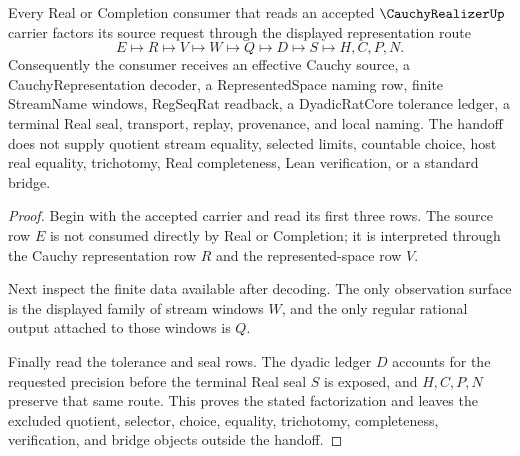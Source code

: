 \begin{theorem}
\label{thm:cauchy-realizer-representation-handoff}
Every Real or Completion consumer that reads an accepted $\CauchyRealizerUp$ carrier factors its source request through the displayed representation route
$$
E \longmapsto R \longmapsto V \longmapsto W \longmapsto Q \longmapsto D \longmapsto S \longmapsto H,C,P,N .
$$
Consequently the consumer receives an effective Cauchy source, a CauchyRepresentation decoder, a RepresentedSpace naming row, finite StreamName windows, RegSeqRat readback, a DyadicRatCore tolerance ledger, a terminal Real seal, transport, replay, provenance, and local naming. The handoff does not supply quotient stream equality, selected limits, countable choice, host real equality, trichotomy, Real completeness, Lean verification, or a standard bridge.
\end{theorem}
\begin{proof}
Begin with the accepted carrier and read its first three rows. The source row $E$ is not consumed directly by Real or Completion; it is interpreted through the Cauchy representation row $R$ and the represented-space row $V$.

Next inspect the finite data available after decoding. The only observation surface is the displayed family of stream windows $W$, and the only regular rational output attached to those windows is $Q$.

Finally read the tolerance and seal rows. The dyadic ledger $D$ accounts for the requested precision before the terminal Real seal $S$ is exposed, and $H,C,P,N$ preserve that same route. This proves the stated factorization and leaves the excluded quotient, selector, choice, equality, trichotomy, completeness, verification, and bridge objects outside the handoff.
\end{proof}

